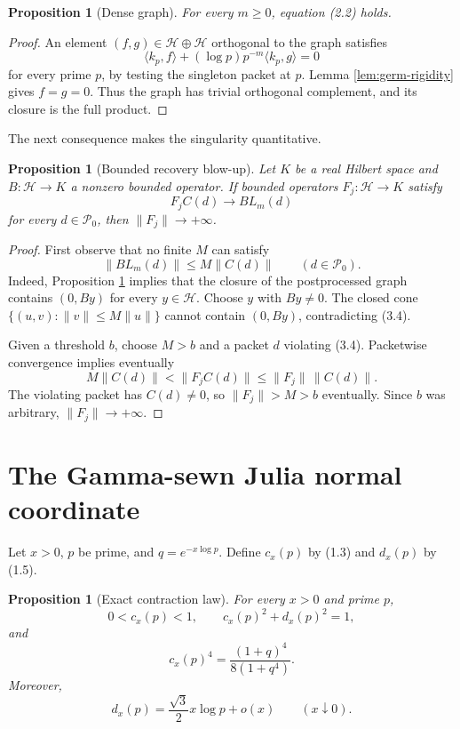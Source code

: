 \documentclass[11pt]{article}
\newtheorem{proposition}[theorem]{Proposition}
\theoremstyle{definition}
\theoremstyle{remark}
\newcommand{\cH}{\mathcal H}
\newcommand{\cP}{\mathcal P}
\begin{document}
\begin{proposition}[Dense graph]\label{prop:dense-graph}
For every \(m\ge0\), equation \emph{(2.2)} holds.
\end{proposition}

\begin{proof}
An element \((f,g)\in\cH\oplus\cH\) orthogonal to the graph satisfies
\[
 \langle k_p,f\rangle+
 (\log p)p^{-m}\langle k_p,g\rangle=0
\]
for every prime \(p\), by testing the singleton packet at \(p\).  Lemma
\ref{lem:germ-rigidity} gives \(f=g=0\).  Thus the graph has trivial orthogonal complement,
and its closure is the full product.
\end{proof}

The next consequence makes the singularity quantitative.

\begin{proposition}[Bounded recovery blow-up]\label{prop:blowup}
Let \(K\) be a real Hilbert space and \(B:\cH\to K\) a nonzero bounded operator.  If bounded
operators \(F_j:\cH\to K\) satisfy
\[
 F_jC(d)\longrightarrow BL_m(d)
\]
for every \(d\in\cP_0\), then \(\|F_j\|\to+\infty\).
\end{proposition}

\begin{proof}
First observe that no finite \(M\) can satisfy
\[
 \|BL_m(d)\|\le M\|C(d)\|\qquad(d\in\cP_0).         \tag{3.4}
\]
Indeed, Proposition \ref{prop:dense-graph} implies that the closure of the postprocessed graph
contains \((0,By)\) for every \(y\in\cH\).  Choose \(y\) with \(By\ne0\).  The closed cone
\(\{(u,v):\|v\|\le M\|u\|\}\) cannot contain \((0,By)\), contradicting (3.4).

Given a threshold \(b\), choose \(M>b\) and a packet \(d\) violating (3.4).  Packetwise
convergence implies eventually
\[
 M\|C(d)\|<\|F_jC(d)\|\le\|F_j\|\,\|C(d)\|.
\]
The violating packet has \(C(d)\ne0\), so \(\|F_j\|>M>b\) eventually.  Since \(b\) was
arbitrary, \(\|F_j\|\to+\infty\).
\end{proof}

\section{The Gamma-sewn Julia normal coordinate}\label{sec:julia}

Let \(x>0\), \(p\) be prime, and \(q=e^{-x\log p}\).  Define \(c_x(p)\) by (1.3) and
\(d_x(p)\) by (1.5).

\begin{proposition}[Exact contraction law]\label{prop:contraction}
For every \(x>0\) and prime \(p\),
\[
 0<c_x(p)<1,\qquad c_x(p)^2+d_x(p)^2=1,             \tag{4.1}
\]
and
\[
 c_x(p)^4=\frac{(1+q)^4}{8(1+q^4)}.                \tag{4.2}
\]
Moreover,
\[
 d_x(p)=\frac{\sqrt3}{2}x\log p+o(x)
 \qquad(x\downarrow0).                              \tag{4.3}
\]
\end{proposition}
\end{document}
